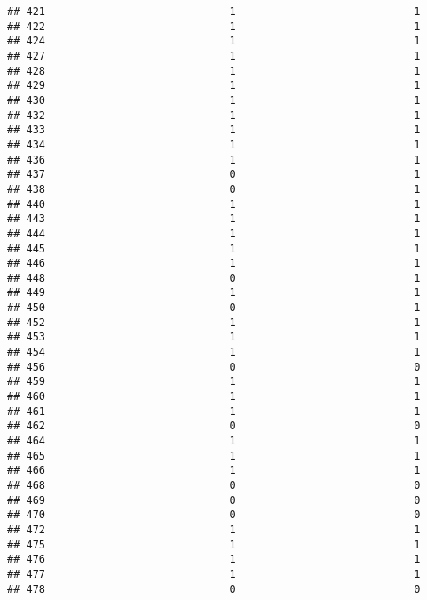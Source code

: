 \documentclass[
]{article}
\begin{document}
\begin{verbatim}
## 421                             1                            1
## 422                             1                            1
## 424                             1                            1
## 427                             1                            1
## 428                             1                            1
## 429                             1                            1
## 430                             1                            1
## 432                             1                            1
## 433                             1                            1
## 434                             1                            1
## 436                             1                            1
## 437                             0                            1
## 438                             0                            1
## 440                             1                            1
## 443                             1                            1
## 444                             1                            1
## 445                             1                            1
## 446                             1                            1
## 448                             0                            1
## 449                             1                            1
## 450                             0                            1
## 452                             1                            1
## 453                             1                            1
## 454                             1                            1
## 456                             0                            0
## 459                             1                            1
## 460                             1                            1
## 461                             1                            1
## 462                             0                            0
## 464                             1                            1
## 465                             1                            1
## 466                             1                            1
## 468                             0                            0
## 469                             0                            0
## 470                             0                            0
## 472                             1                            1
## 475                             1                            1
## 476                             1                            1
## 477                             1                            1
## 478                             0                            0

\end{verbatim}
\end{document}
